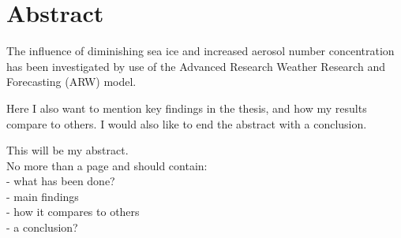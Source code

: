 \chapter*{Abstract}
The influence of diminishing sea ice and increased aerosol number concentration has been investigated by use of the Advanced Research Weather Research and Forecasting (ARW) model.

Here I also want to mention key findings in the thesis, and how my results compare to others. I would also like to end the abstract with a conclusion.


This will be my abstract. \\
No more than a page and should contain:\\
- what has been done?\\
- main findings\\
- how it compares to others\\
- a conclusion?